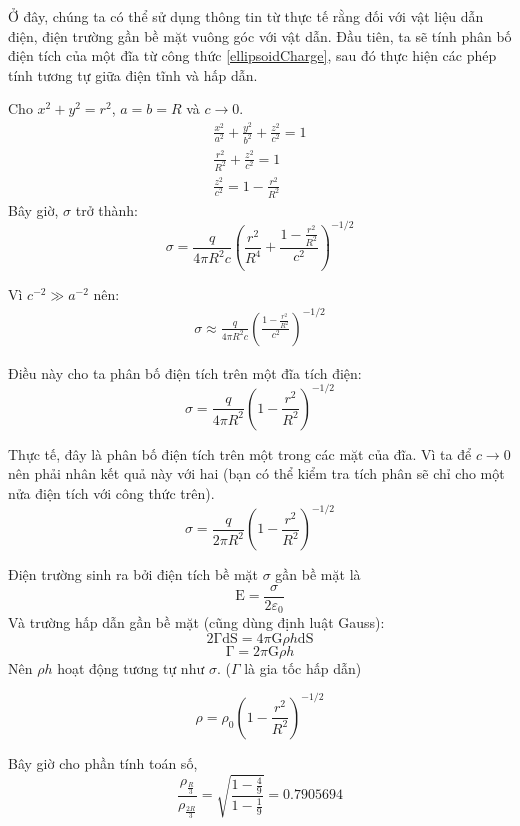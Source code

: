 \begin{solution}

Ở đây, chúng ta có thể sử dụng thông tin từ thực tế rằng đối với vật liệu dẫn điện, điện trường gần bề mặt vuông góc với vật dẫn. Đầu tiên, ta sẽ tính phân bố điện tích của một đĩa từ công thức \eqref{ellipsoidCharge}, sau đó thực hiện các phép tính tương tự giữa điện tĩnh và hấp dẫn.

Cho $x^2+y^2 = r^2$, $a=b=R$ và $c\rightarrow 0$.
\begin{gather*}
    \frac{x^2}{a^2} + \frac{y^2}{b^2} + \frac{z^2}{c^2} = 1\\
    \frac{r^2}{R^2}+\frac{z^2}{c^2}=1\\
    \frac{z^2}{c^2} = 1 - \frac{r^2}{R^2} 
\end{gather*}
Bây giờ, $\sigma$ trở thành:
\begin{equation*}
    \sigma = \frac{q}{4\pi R^2c} {\left( \frac{r^2}{R^4}
    + \frac{1 - \frac{r^2}{R^2}}{c^2} \right)} ^ {-1 / 2}
\end{equation*}

Vì $c^{-2} \gg a^{-2}$ nên:
\begin{gather*}
    \sigma \approx \frac{q}{4\pi R^2c} {\left(\frac{1 - \frac{r^2}{R^2}}{c^2}
    \right)} ^ {-1 / 2} 
\end{gather*}

Điều này cho ta phân bố điện tích trên một đĩa tích điện:
\begin{equation*}
    \sigma = \frac{q}{4\pi R^2} {\left(1 - \frac{r^2}{R^2}
    \right)} ^ {-1 / 2} 
\end{equation*}

Thực tế, đây là phân bố điện tích trên một trong các mặt của đĩa. 
Vì ta để  $c \rightarrow 0$ nên phải nhân kết quả này với hai (bạn có thể kiểm tra tích phân sẽ chỉ cho một nửa điện tích với công thức trên).
\begin{equation*}
    \sigma = \frac{q}{2\pi R^2} {\left(1 - \frac{r^2}{R^2}
    \right)} ^ {-1 / 2} 
\end{equation*}

Điện trường sinh ra bởi điện tích bề mặt $\sigma$ gần bề mặt là
\[ \mathrm{E} = \frac{\sigma}{2\varepsilon_0} \]
Và trường hấp dẫn gần bề mặt (cũng dùng định luật Gauss):
\[ 2 \mathrm{\Gamma} \mathrm{dS}= 4 \pi \mathrm{G} \rho h \mathrm{dS}\]
\[ \mathrm{\Gamma} = 2 \pi \mathrm{G} \rho h\]
Nên $\rho h$ hoạt động tương tự như $\sigma$. ($\Gamma$ là gia tốc hấp dẫn)

\begin{equation}
    \rho = \rho_0 {\left(1 - \frac{r^2}{R^2} \right)} ^ {-1 / 2} 
    \label{densityDistribution}
\end{equation}

Bây giờ cho phần tính toán số,
\begin{equation*}
    \frac{\rho_{\frac{R}{3}}}{\rho_{\frac{2R}{3}}} =
    \sqrt{\frac{1 - \frac{4}{9}}{1 - \frac{1}{9}}} = 0.7905694
\end{equation*}

\end{solution}